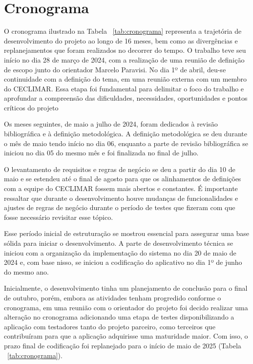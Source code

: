 \chapter{Cronograma}\label{cronograma}

O cronograma ilustrado na Tabela ~\ref{tab:cronograma} representa a trajetória de desenvolvimento do projeto ao longo de 16 meses, bem como as divergências e replanejamentos que foram realizados no decorrer do tempo. O trabalho teve seu início no dia 28 de março de 2024, com a realização de uma reunião de definição de escopo junto do orientador Marcelo Paravisi. No dia 1º de abril, deu-se continuidade com a definição do tema, em uma reunião externa com um membro do CECLIMAR. Essa etapa foi fundamental para delimitar o foco do trabalho e aprofundar a compreensão das dificuldades, necessidades, oportunidades e pontos críticos do projeto

Os meses seguintes, de maio a julho de 2024, foram dedicados à revisão bibliográfica e à definição metodológica. A definição metodológica se deu durante o mês de maio tendo início no dia 06, enquanto a parte de revisão bibliográfica se iniciou no dia 05 do mesmo mês e foi finalizada no final de julho. 

O levantamento de requisitos e regras de negócio se deu a partir do dia 10 de maio e se estendeu até o final de agosto para que os alinhamentos de definições com a equipe do CECLIMAR fossem mais abertos e constantes. É importante ressaltar que durante o desenvolvimento houve mudanças de funcionalidades e ajustes de regras de negócio durante o período de testes que fizeram com que fosse necessário revisitar esse tópico. 

Esse período inicial de estruturação se mostrou essencial para assegurar uma base sólida para iniciar o desenvolvimento. A parte de desenvolvimento técnica se iniciou com a organização da implementação do sistema no dia 20 de maio de 2024 e, com base nisso, se iniciou a codificação do aplicativo no dia 1º de junho do mesmo ano. 

Inicialmente, o desenvolvimento tinha um planejamento de conclusão para o final de outubro, porém, embora as atividades tenham progredido conforme o cronograma, em uma reunião com o orientador do projeto foi decido realizar uma alteração no cronograma adicionando uma etapa de testes disponibilizando a aplicação com testadores tanto do projeto parceiro, como terceiros que contribuíram para que a aplicação adquirisse uma maturidade maior. Com isso, o prazo final de codificação foi replanejado para o início de maio de 2025 (Tabela ~\ref{tab:cronograma}).

